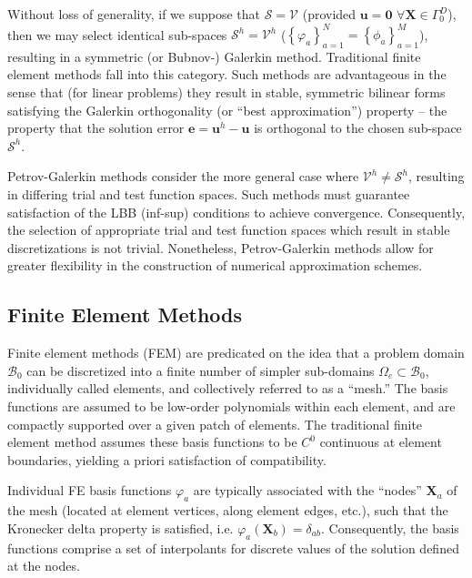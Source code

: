 Without loss of generality, if we suppose that $\mathcal{S} = \mathcal{V}$ (provided $\mathbf{u} = \mathbf{0} \, \, \forall \mathbf{X} \in \Gamma^D_0$), then we may select identical sub-spaces $\mathcal{S}^h = \mathcal{V}^h$ ($\left\{ \varphi_a \right\}_{a = 1}^{N} = \left\{ \phi_a \right\}_{a = 1}^{M}$), resulting in a symmetric (or Bubnov-) Galerkin method. Traditional finite element methods fall into this category. Such methods are advantageous in the sense that (for linear problems) they result in stable, symmetric bilinear forms satisfying the Galerkin orthogonality (or ``best approximation'') property -- the property that the solution error $\mathbf{e} = \mathbf{u}^h - \mathbf{u}$ is orthogonal to the chosen sub-space $\mathcal{S}^h$.

Petrov-Galerkin methods consider the more general case where $\mathcal{V}^h \neq \mathcal{S}^h$, resulting in differing trial and test function spaces. Such methods must guarantee satisfaction of the LBB (inf-sup) conditions to achieve convergence. Consequently, the selection of appropriate trial and test function spaces which result in stable discretizations is not trivial. Nonetheless, Petrov-Galerkin methods allow for greater flexibility in the construction of numerical approximation schemes.

\subsection*{Finite Element Methods}

Finite element methods (FEM) are predicated on the idea that a problem domain $\mathcal{B}_0$ can be discretized into a finite number of simpler sub-domains $\Omega_e \subset \mathcal{B}_0$, individually called elements, and collectively referred to as a ``mesh.'' The basis functions are assumed to be low-order polynomials within each element, and are compactly supported over a given patch of elements. The traditional finite element method assumes these basis functions to be $C^0$ continuous at element boundaries, yielding a priori satisfaction of compatibility.

Individual FE basis functions $\varphi_a$ are typically associated with the ``nodes'' $\mathbf{X}_a$ of the mesh (located at element vertices, along element edges, etc.), such that the Kronecker delta property is satisfied, i.e. $\varphi_a (\mathbf{X}_b) = \delta_{ab}$. Consequently, the basis functions comprise a set of interpolants for discrete values of the solution defined at the nodes.

